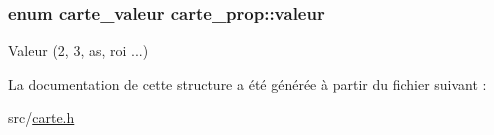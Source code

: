 \subsubsection[{\texorpdfstring{valeur}{valeur}}]{\setlength{\rightskip}{0pt plus 5cm}enum {\bf carte\+\_\+valeur} carte\+\_\+prop\+::valeur}\hypertarget{structcarte__prop_a8069caea55ffab4bbdbb27b9d2b1c651}{}\label{structcarte__prop_a8069caea55ffab4bbdbb27b9d2b1c651}
Valeur (2, 3, as, roi ...) 

La documentation de cette structure a été générée à partir du fichier suivant \+:\begin{DoxyCompactItemize}
\item 
src/\hyperlink{carte_8h}{carte.\+h}\end{DoxyCompactItemize}
